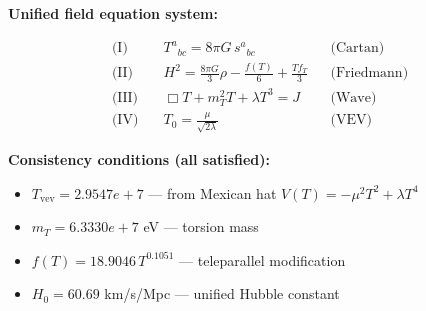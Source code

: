 
\textbf{Unified field equation system:}

\begin{align}
  \text{(I)} \quad & T^a{}_{bc} = 8\pi G \, s^a{}_{bc} && \text{(Cartan)} \\
  \text{(II)} \quad & H^2 = \frac{8\pi G}{3}\rho - \frac{f(T)}{6} + \frac{Tf_T}{3} && \text{(Friedmann)} \\
  \text{(III)} \quad & \Box T + m_T^2 T + \lambda T^3 = J && \text{(Wave)} \\
  \text{(IV)} \quad & T_0 = \frac{\mu}{\sqrt{2\lambda}} && \text{(VEV)}
\end{align}

\textbf{Consistency conditions (all satisfied):}
\begin{itemize}
  \item $T_{\text{vev}} = 2.9547e+7$ — from Mexican hat $V(T) = -\mu^2 T^2 + \lambda T^4$
  \item $m_T = 6.3330e+7$ eV — torsion mass
  \item $f(T) = 18.9046 \, T^{0.1051}$ — teleparallel modification
  \item $H_0 = 60.69$ km/s/Mpc — unified Hubble constant
\end{itemize}